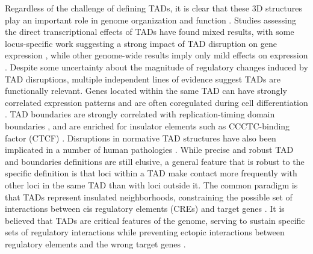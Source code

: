 Regardless of the challenge of defining TADs, it is clear that these 3D structures play an important role in genome organization and function \cite{Berlivet.2013, Dixon.2016, Beagan.2020, Andrey.2017, Franke.2018, Xie.2019, Dixon.2015, Delaneau.2019, Smith.2016}. Studies assessing the direct transcriptional effects of TADs have found mixed results, with some locus-specific work suggesting a strong impact of TAD disruption on gene expression \cite{Lupianez.2015, Hnisz.2016, Guo.2015, Laugsch.2019}, while other genome-wide results imply only mild effects on expression \cite{Ghavi-Helm.2019, Zuin.2014, Espinola.2020, Rao.2017}. Despite some uncertainty about the magnitude of regulatory changes induced by TAD disruptions, multiple independent lines of evidence suggest TADs are functionally relevant. Genes located within the same TAD can have strongly correlated expression patterns and are often coregulated during cell differentiation \cite{Nora.2012, Zhan.2017, Ramirez.2018}. TAD boundaries are strongly correlated with replication-timing domain boundaries \cite{Pope.2014}, and are enriched for insulator elements such as CCCTC-binding factor (CTCF) \cite{Dixon.2012, Rao.2014}. Disruptions in normative TAD structures have also been implicated in a number of human pathologies \cite{Lupianez.2016, Ibn-Salem.2014, Franke.2016}. While precise and robust TAD and boundaries definitions are still elusive, a general feature that is robust to the specific definition is that loci within a TAD make contact more frequently with other loci in the same TAD than with loci outside it. The common paradigm is that TADs represent insulated neighborhoods, constraining the possible set of interactions between cis regulatory elements (CREs) and target genes \cite{Andrey.2017, Franke.2018, Dixon.2015, Delaneau.2019, Smith.2016, Symmons.2014, Tanay.2013}. It is believed that TADs are critical features of the genome, serving to sustain specific sets of regulatory interactions while preventing ectopic interactions between regulatory elements and the wrong target genes \cite{Andrey.2017, Symmons.2014, Sexton.2015}.

